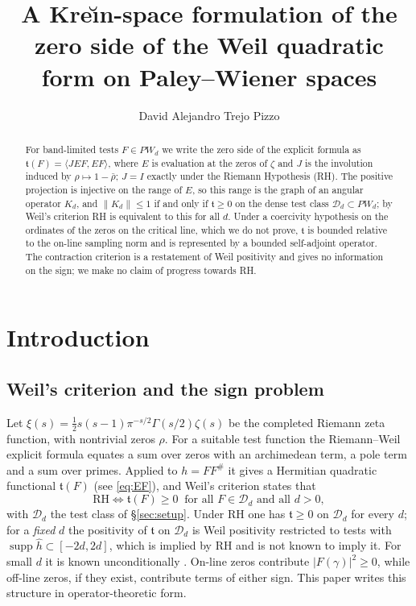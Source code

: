 \documentclass[11pt]{amsart}
\title[Kre\u{\i}n-space formulation of the Weil form]{A Kre\u{\i}n-space formulation of the zero side of the Weil quadratic form on Paley--Wiener spaces}
\author{David Alejandro Trejo Pizzo}
\theoremstyle{definition}
\theoremstyle{remark}
\newcommand{\half}{\tfrac12}
\newcommand{\PW}{\mathit{PW}_d}
\newcommand{\tform}{\mathfrak t}
\newcommand{\Kop}{K}
\newcommand{\Norm}[1]{\lVert #1 \rVert}
\begin{document}
\begin{abstract}
For band-limited tests $F\in\PW$ we write the zero side of the explicit formula as
$\tform(F)=\langle JEF,EF\rangle$, where $E$ is evaluation at the zeros of $\zeta$ and $J$
is the involution induced by $\rho\mapsto1-\bar\rho$; $J=I$ exactly under the Riemann
Hypothesis (RH). The positive projection is injective on the range of $E$, so this range is
the graph of an angular operator $\Kop_d$, and $\Norm{\Kop_d}\le1$ if and only if
$\tform\ge0$ on the dense test class $\mathcal D_d\subset\PW$; by Weil's criterion RH is equivalent to this for all $d$. Under a
coercivity hypothesis on the ordinates of the zeros on the critical line, which we do not
prove, $\tform$ is bounded relative to the on-line sampling norm and is represented by a
bounded self-adjoint operator. The contraction criterion is a restatement of Weil
positivity and gives no information on the sign; we make no claim of progress towards RH.
\end{abstract}

\maketitle

\tableofcontents

\section{Introduction}\label{sec:intro}
\subsection{Weil's criterion and the sign problem}
Let $\xi(s)=\half s(s-1)\pi^{-s/2}\Gamma(s/2)\zeta(s)$ be the completed Riemann zeta
function, with nontrivial zeros $\rho$. For a suitable test function the Riemann--Weil
explicit formula equates a sum over zeros with an archimedean term, a pole term and a sum
over primes. Applied to $h=FF^{\#}$ it gives a Hermitian quadratic functional $\tform(F)$
(see \eqref{eq:EF}), and Weil's criterion \cite{Weil1952,Bombieri2000} states that
\begin{equation}\label{eq:weil}
\mathrm{RH}\iff \tform(F)\ge0\ \text{ for all } F\in\mathcal D_d \text{ and all } d>0,
\end{equation}
with $\mathcal D_d$ the test class of \S\ref{sec:setup}. Under RH one has $\tform\ge0$ on
$\mathcal D_d$ for every $d$; for a \emph{fixed} $d$ the positivity of $\tform$ on
$\mathcal D_d$ is Weil positivity restricted to tests with $\operatorname{supp}\widehat
h\subset[-2d,2d]$, which is implied by RH and is not known to imply it. For small $d$ it is
known unconditionally \cite{Yoshida}. On-line zeros contribute $|F(\gamma)|^{2}\ge0$,
while off-line zeros, if they exist, contribute terms of either sign. This paper writes
this structure in operator-theoretic form.
\end{document}

